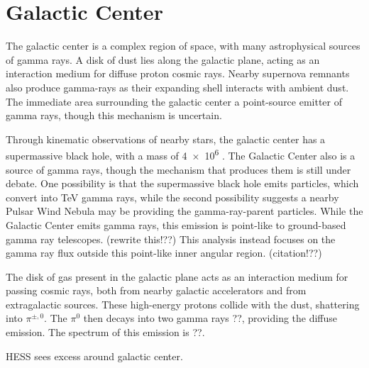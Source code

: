 \section{Galactic Center}
The galactic center is a complex region of space, with many astrophysical sources of gamma rays.
A disk of dust lies along the galactic plane, acting as an interaction medium for diffuse proton cosmic rays.
Nearby supernova remnants also produce gamma-rays as their expanding shell interacts with ambient dust.
The immediate area surrounding the galactic center a point-source emitter of gamma rays, though this mechanism is uncertain.

Through kinematic observations of nearby stars, the galactic center has a supermassive black hole, with a mass of \SI{4e6}{\Msol} \cite{sgra_massdist}.
The Galactic Center also is a source of \TeV{} gamma rays, though the mechanism that produces them is still under debate.
One possibility is that the supermassive black hole emits particles, which convert into TeV gamma rays, while the second possibility suggests a nearby Pulsar Wind Nebula may be providing the gamma-ray-parent particles.
While the Galactic Center emits gamma rays, this emission is point-like to ground-based gamma ray telescopes. {\color{red}(rewrite this!??)}
This analysis instead focuses on the gamma ray flux outside this point-like inner angular region. {\color{red}(citation!??)}

The disk of gas present in the galactic plane acts as an interaction medium for passing cosmic rays, both from nearby galactic accelerators and from extragalactic sources.
These high-energy protons collide with the dust, shattering into $\pi^{\pm,0}$.
The $\pi^0$ then decays into two gamma rays {\color{red}??}, providing the diffuse emission.
The spectrum of this emission is {\color{red}??}.

HESS sees excess around galactic center.


